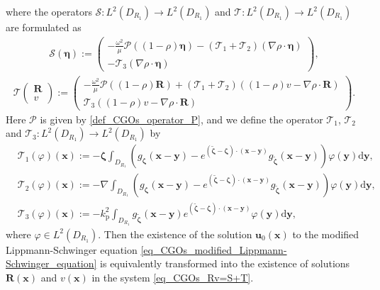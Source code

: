\documentclass[11pt,reqno,oneside]{amsart}
\theoremstyle{definition}
\theoremstyle{remark}
\numberwithin{equation}{section}
\numberwithin{equation}{section}
\theoremstyle{remark}
\begin{document}
where the operators $ \mathcal{S} : L^2\left(D_{R_1}\right)\to L^2\left(D_{R_1}\right) $ and $ \mathcal{T} : L^2\left(D_{R_1}\right)\to L^2\left(D_{R_1}\right) $ are formulated as 
\begin{align*} 
	\mathcal{S}\left(\bm{\eta}\right) :=
	\begin{pmatrix}
		-\frac{\omega^2}{\mu} \mathcal{P}\left(\left(1-\rho\right) \bm{\eta}\right) - \left(\mathcal{T}_1 + \mathcal{T}_2\right) \left(\nabla \rho \cdot \bm{\eta}\right) \\
		-\mathcal{T}_3 \left( \nabla \rho \cdot \bm{\eta}\right)
	\end{pmatrix},
\end{align*}
\begin{align*} 
	\mathcal{T} \begin{pmatrix}
		\mathbf{R} \\
		v
	\end{pmatrix} := 
	\begin{pmatrix}
		-\frac{\omega^2}{\mu} \mathcal{P}\left(\left(1-\rho\right) \mathbf{R}\right) + \left(\mathcal{T}_1 + \mathcal{T}_2\right) \left(\left(1-\rho\right) v - \nabla \rho \cdot \mathbf{R}\right) \\
		\mathcal{T}_3 \left(\left(1-\rho\right) v - \nabla \rho \cdot \mathbf{R}\right)
	\end{pmatrix}.
\end{align*}
Here $ \mathcal{P} $ is given by \eqref{def_CGOs_operator_P}, and we define the operator $ \mathcal{T}_1 $, $ \mathcal{T}_2 $ and $ \mathcal{T}_3 : L^2\left(D_{R_1}\right)\to L^2\left(D_{R_1}\right) $ by
\begin{align*} 
	&\mathcal{T}_1\left(\varphi\right)\left(\mathbf{x}\right) := - \bm{\zeta} \int_{D_{R_1}} \left(g_{\bm{\zeta}}\left(\mathbf{x} - \mathbf{y}\right) - e^{\left(\tilde{\bm{\zeta}}-\bm{\zeta}\right) \cdot \left(\mathbf{x} - \mathbf{y}\right)} g_{\tilde{\bm{\zeta}}}\left(\mathbf{x} - \mathbf{y}\right)\right) \varphi\left(\mathbf{y}\right) \mathrm{d} \mathbf{y}, \\
	&\mathcal{T}_2\left(\varphi\right)\left(\mathbf{x}\right) := - \nabla \int_{D_{R_1}} \left(g_{\bm{\zeta}}\left(\mathbf{x} - \mathbf{y}\right) - e^{\left(\tilde{\bm{\zeta}}-\bm{\zeta}\right) \cdot \left(\mathbf{x} - \mathbf{y}\right)} g_{\tilde{\bm{\zeta}}}\left(\mathbf{x} - \mathbf{y}\right)\right) \varphi\left(\mathbf{y}\right) \mathrm{d} \mathbf{y}, \\
	&\mathcal{T}_3\left(\varphi\right)\left(\mathbf{x}\right) := - k_{\mathrm{p}}^2 \int_{D_{R_1}} g_{\tilde{\bm{\zeta}}}\left(\mathbf{x} - \mathbf{y}\right) e^{\left(\tilde{\bm{\zeta}}-\bm{\zeta}\right) \cdot \left(\mathbf{x} - \mathbf{y}\right)}\varphi\left(\mathbf{y}\right) \mathrm{d} \mathbf{y},
\end{align*}
where $ \varphi \in L^2 \left(D_{R_1}\right) $. Then the existence of the solution $ \mathbf{u}_0\left(\mathbf{x}\right) $ to the modified Lippmann-Schwinger equation \eqref{eq_CGOs_modified_Lippmann-Schwinger_equation} is equivalently transformed into the existence of solutions $ \mathbf{R}\left(\mathbf{x}\right) $ and $ v\left(\mathbf{x}\right) $ in the system \eqref{eq_CGOs_Rv=S+T}.
\end{document}
